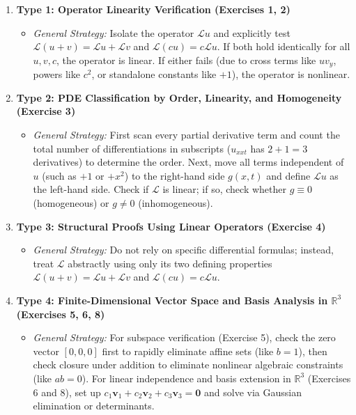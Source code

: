 \documentclass[11pt,a4paper]{article}
\begin{document}
\begin{enumerate}
    \item \textbf{Type 1: Operator Linearity Verification (Exercises 1, 2)}
    \begin{itemize}
        \item \emph{General Strategy:} Isolate the operator $\mathcal{L}u$ and explicitly test $\mathcal{L}(u+v) = \mathcal{L}u + \mathcal{L}v$ and $\mathcal{L}(cu) = c\mathcal{L}u$. If both hold identically for all $u, v, c$, the operator is linear. If either fails (due to cross terms like $u v_y$, powers like $c^2$, or standalone constants like $+1$), the operator is nonlinear.
    \end{itemize}
    \item \textbf{Type 2: PDE Classification by Order, Linearity, and Homogeneity (Exercise 3)}
    \begin{itemize}
        \item \emph{General Strategy:} First scan every partial derivative term and count the total number of differentiations in subscripts ($u_{xxt}$ has $2+1=3$ derivatives) to determine the order. Next, move all terms independent of $u$ (such as $+1$ or $+x^2$) to the right-hand side $g(x, t)$ and define $\mathcal{L}u$ as the left-hand side. Check if $\mathcal{L}$ is linear; if so, check whether $g \equiv 0$ (homogeneous) or $g \neq 0$ (inhomogeneous).
    \end{itemize}
    \item \textbf{Type 3: Structural Proofs Using Linear Operators (Exercise 4)}
    \begin{itemize}
        \item \emph{General Strategy:} Do not rely on specific differential formulas; instead, treat $\mathcal{L}$ abstractly using only its two defining properties $\mathcal{L}(u+v) = \mathcal{L}u + \mathcal{L}v$ and $\mathcal{L}(cu) = c\mathcal{L}u$.
    \end{itemize}
    \item \textbf{Type 4: Finite-Dimensional Vector Space and Basis Analysis in $\mathbb{R}^3$ (Exercises 5, 6, 8)}
    \begin{itemize}
        \item \emph{General Strategy:} For subspace verification (Exercise 5), check the zero vector $[0,0,0]$ first to rapidly eliminate affine sets (like $b=1$), then check closure under addition to eliminate nonlinear algebraic constraints (like $ab=0$). For linear independence and basis extension in $\mathbb{R}^3$ (Exercises 6 and 8), set up $c_1\mathbf{v}_1 + c_2\mathbf{v}_2 + c_3\mathbf{v}_3 = \mathbf{0}$ and solve via Gaussian elimination or determinants.

\end{itemize}
\end{enumerate}
\end{document}
